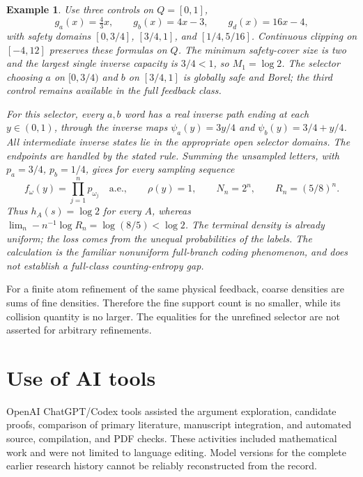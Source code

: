 \documentclass[11pt,reqno]{amsart}
\numberwithin{equation}{section}
\newtheorem{example}[theorem]{Example}
\theoremstyle{definition}
\begin{document}
\begin{example}\label{ex:collision-boundary}
Use three controls on $Q=[0,1]$,
\[
 g_a(x)=\tfrac43x,\qquad g_b(x)=4x-3,\qquad g_d(x)=16x-4,
\]
with safety domains $[0,3/4]$, $[3/4,1]$, and $[1/4,5/16]$.
Continuous clipping on $[-4,12]$ preserves these formulas on
$Q$. The minimum safety-cover size is two and the largest
single inverse capacity is $3/4<1$, so $M_1=\log2$.
The selector choosing $a$ on $[0,3/4)$ and $b$ on $[3/4,1]$
is globally safe and Borel; the third control remains available
in the full feedback class.

For this selector, every $a,b$ word has a real inverse path
ending at each $y\in(0,1)$, through the inverse maps
$\psi_a(y)=3y/4$ and $\psi_b(y)=3/4+y/4$.
All intermediate inverse states lie in the appropriate open
selector domains. The endpoints are handled by the stated rule.
Summing the unsampled letters, with $p_a=3/4$, $p_b=1/4$,
gives for every sampling sequence
\[
 f_\omega(y)=\prod_{j=1}^np_{\omega_j}\quad\text{a.e.},\qquad
 \rho(y)=1,\qquad N_n=2^n,\qquad R_n=(5/8)^n.
\]
Thus $h_A(s)=\log2$ for every $A$, whereas
$\lim_n-n^{-1}\log R_n=\log(8/5)<\log2$.
The terminal density is already uniform; the loss comes from
the unequal probabilities of the labels. The calculation is
the familiar nonuniform full-branch coding phenomenon, and
does not establish a full-class counting-entropy gap.
\end{example}

For a finite atom refinement of the same physical feedback,
coarse densities are sums of fine densities. Therefore the
fine support count is no smaller, while its collision quantity
is no larger. The equalities for the unrefined selector are
not asserted for arbitrary refinements.


\section*{Use of AI tools}
OpenAI ChatGPT/Codex tools assisted the argument exploration,
candidate proofs, comparison of primary literature, manuscript
integration, and automated source, compilation, and PDF checks.
These activities included mathematical work and were not limited
to language editing. Model versions for the complete earlier
research history cannot be reliably reconstructed from the record.
\end{document}
